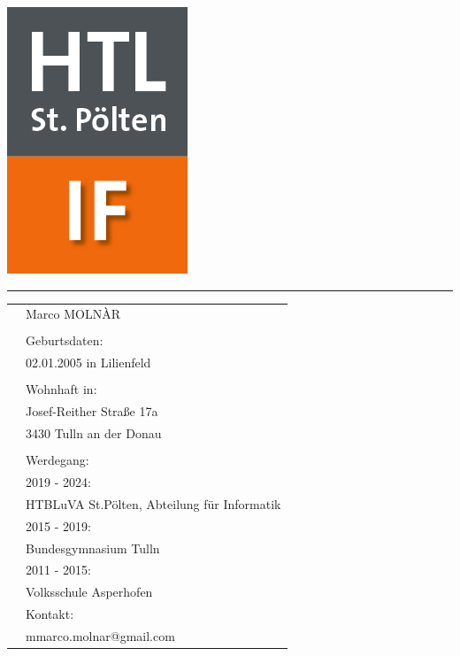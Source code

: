\begin{flushleft}
    \hspace{3cm} \includegraphics[scale=0.3]{images/HTL_IF.png} 
    
    \vspace{-0.9cm}
    \hspace{6cm}
    \textcolor{green}{\rule{8cm}{5pt}}
\end{flushleft}

\begin{tabular}{p{3cm}l}
    & Marco MOLNÀR \\
    \\
    & Geburtsdaten: \\
    &02.01.2005 in Lilienfeld \\
    \\
    &Wohnhaft in: \\
    &Josef-Reither Straße 17a \\
    &3430 Tulln an der Donau \\
    \\
    &Werdegang:\\
    &2019 - 2024: \\
    &HTBLuVA St.Pölten, Abteilung für Informatik \\
    &2015 - 2019: \\
    &Bundesgymnasium Tulln \\
    &2011 - 2015: \\
    &Volksschule Asperhofen
    \\
    &Kontakt: \\
    &mmarco.molnar@gmail.com \\
\end{tabular}


\clearpage


